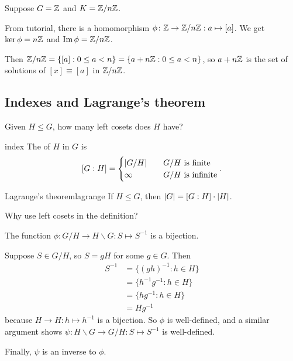 \documentclass[12pt,letterpaper]{report}
\begin{document}
\begin{ex}
  Suppose $G = \mathbb{Z}$ and $K = \mathbb{Z}/{n}\mathbb{Z}$.

  From tutorial, there is a homomorphism $\phi \colon \mathbb{Z} \to \mathbb{Z}/{n}\mathbb{Z} : a \mapsto [a]$.
  We get $\ker\phi = n\mathbb{Z}$ and $\operatorname{Im}\phi = \mathbb{Z}/{n}\mathbb{Z}$.

  Then $\mathbb{Z}/{n}\mathbb{Z} = \{[a] : 0 \leq a < n\} = \{a + n\mathbb{Z} : 0 \leq a < n\}$, so
  $a + n\mathbb{Z}$ is the set of solutions of $[x] \equiv [a]$ in $\mathbb{Z}/{n}\mathbb{Z}$.
\end{ex}

\pagebreak
\subsection{Indexes and Lagrange's theorem}

Given $H \leq G$, how many left cosets does $H$ have?

\begin{defn}{index}{}
  The  of $H$ in $G$ is
  \[
    [G : H] = \begin{cases}
      \lvert G/H\rvert \quad & G/H \text{ is finite} \\
      \infty & G/H \text{ is infinite}
    \end{cases}.
  \]
\end{defn}

\begin{thm}{Lagrange's theorem}{lagrange}
  If $H \leq G$, then $\lvert G\rvert = [G : H] \cdot \lvert H\rvert$.
\end{thm}

Why use left cosets in the definition?

\begin{prop}{}{}
  The function $\phi \colon G/H \to H \backslash G : S \mapsto S^{-1}$ is a bijection.
\end{prop}

\begin{thmproof}
  Suppose $S \in G/H$, so $S = gH$ for some $g \in G$.
  Then
  \begin{align*}
    S^{-1} &= \{(gh)^{-1} : h \in H\} \\
    &= \{h^{-1}g^{-1} : h \in H\} \\
    &= \{hg^{-1} : h \in H\} \\
    &= Hg^{-1}
  \end{align*}
  because $H \to H : h \mapsto h^{-1}$ is a bijection.
  So $\phi$ is well-defined, and a similar argument shows
  $\psi \colon H \backslash G \to G/H : S \mapsto S^{-1}$ is well-defined.

  Finally, $\psi$ is an inverse to $\phi$.
\end{thmproof}
\end{document}
